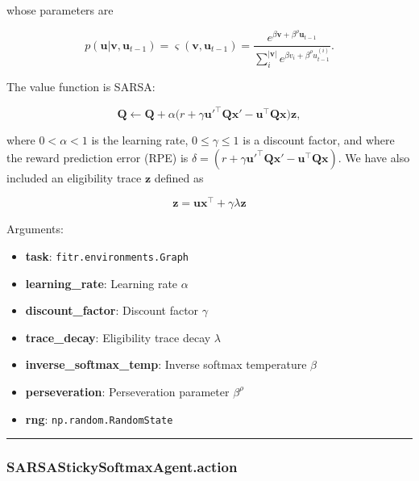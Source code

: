 whose parameters are

\[
p(\mathbf u|\mathbf v, \mathbf u_{t-1}) = \varsigma(\mathbf v, \mathbf u_{t-1}) = \frac{e^{\beta \mathbf v + \beta^\rho \mathbf u_{t-1}}}{\sum_{i}^{|\mathbf v|} e^{\beta v_i + \beta^\rho u_{t-1}^{(i)}}}.
\]

The value function is SARSA:

\[
\mathbf Q \gets \mathbf Q + \alpha \big(r + \gamma \mathbf u'^\top \mathbf Q \mathbf x' - \mathbf u^\top \mathbf Q \mathbf x \big) \mathbf z,
\]

where \(0 < \alpha < 1\) is the learning rate, \(0 \leq \gamma \leq 1\)
is a discount factor, and where the reward prediction error (RPE) is
\(\delta = (r + \gamma \mathbf u'^\top \mathbf Q \mathbf x' - \mathbf u^\top \mathbf Q \mathbf x)\).
We have also included an eligibility trace \(\mathbf z\) defined as

\[
\mathbf z = \mathbf u \mathbf x^\top +  \gamma \lambda \mathbf z
\]

Arguments:

\begin{itemize}
\tightlist
\item
  \textbf{task}: \texttt{fitr.environments.Graph}
\item
  \textbf{learning\_rate}: Learning rate \(\alpha\)
\item
  \textbf{discount\_factor}: Discount factor \(\gamma\)
\item
  \textbf{trace\_decay}: Eligibility trace decay \(\lambda\)
\item
  \textbf{inverse\_softmax\_temp}: Inverse softmax temperature \(\beta\)
\item
  \textbf{perseveration}: Perseveration parameter \(\beta^\rho\)
\item
  \textbf{rng}: \texttt{np.random.RandomState}
\end{itemize}

\begin{center}\rule{0.5\linewidth}{\linethickness}\end{center}

\subsubsection{SARSAStickySoftmaxAgent.action}\label{sarsastickysoftmaxagent.action}

\begin{Shaded}
\begin{Highlighting}[]
\end{Highlighting}
\end{Shaded}

